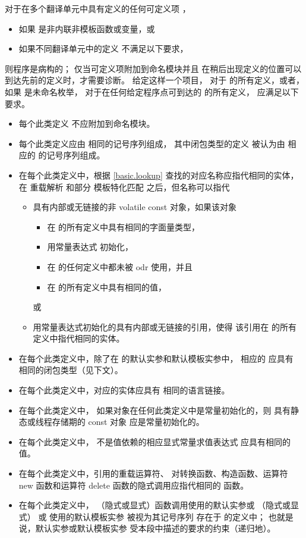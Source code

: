 \pnum
对于在多个翻译单元中具有定义的任何可定义项 ，
\begin{itemize}
\item
如果  是非内联非模板函数或变量，或
\item
如果不同翻译单元中的定义
不满足以下要求，
\end{itemize}
则程序是病构的；
仅当可定义项附加到命名模块并且
在稍后出现定义的位置可以到达先前的定义时，才需要诊断。
给定这样一个项目，
对于  的所有定义，或者，
如果  是未命名枚举，
对于在任何给定程序点可到达的  的所有定义，
应满足以下要求。
\begin{itemize}
\item 每个此类定义
不应附加到命名模块。
\item 每个此类定义应由
相同的记号序列组成，
其中闭包类型的定义
被认为由
相应的  的记号序列组成。
\item 在每个此类定义中，根据 \ref{basic.lookup} 查找的对应名称应指代相同的实体，在
重载解析 和部分
模板特化匹配 之后，但名称可以指代
\begin{itemize}
\item
具有内部或无链接的非 volatile const 对象，如果该对象
\begin{itemize}
\item 在  的所有定义中具有相同的字面量类型，
\item 用常量表达式 初始化，
\item 在  的任何定义中都未被 odr 使用，并且
\item 在  的所有定义中具有相同的值，
\end{itemize}
或
\item
用常量表达式初始化的具有内部或无链接的引用，使得
该引用在  的所有定义中指代相同的实体。
\end{itemize}

\item 在每个此类定义中，除了在
 的默认实参和默认模板实参中，
相应的  应具有
相同的闭包类型（见下文）。

\item 在每个此类定义中，对应的实体应具有
相同的语言链接。

\item 在每个此类定义中，
如果对象在任何此类定义中是常量初始化的，则
具有静态或线程存储期的 const 对象
应是常量初始化的。

\item 在每个此类定义中，
不是值依赖的相应显式常量求值表达式
应具有相同的值。

\item 在每个此类定义中，引用的重载运算符、
对转换函数、构造函数、运算符
new 函数和运算符 delete 函数的隐式调用应指代相同的
函数。

\item 在每个此类定义中，
（隐式或显式）函数调用使用的默认实参或
（隐式或显式）
 或  使用的默认模板实参
被视为其记号序列
存在于  的定义中；
也就是说，默认实参或默认模板实参
受本段中描述的要求的约束（递归地）。
\end{itemize}

